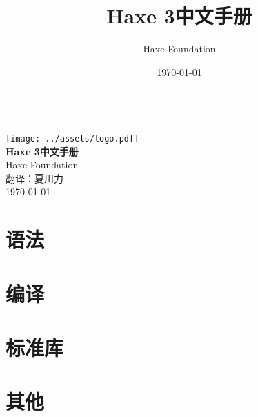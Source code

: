 \documentclass{../haxe}
\renewcommand{\maketitle}{
   \begin{titlepage}
     \setcounter{page}{-1}
			\begin{center}
				~\\[3cm]
				\texttt{[image: ../assets/logo.pdf]}~\\[1cm]
				{\huge \bfseries Haxe 3中文手册}\\[7cm]
				Haxe Foundation\\
				翻译：夏川力\\
				\today
			\end{center}
   \end{titlepage}
}
\begin{document}
\title{Haxe 3中文手册}
\author{Haxe Foundation}
\date{\today}
\maketitle


\clearpage
\todototoc
\listoftodos
\clearpage

\clearpage
\tableofcontents
\clearpage



\part{语法}






\part{编译}




\part{标准库}


\part{其他}


\end{document}
